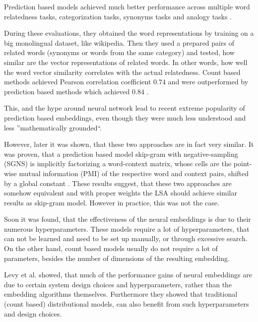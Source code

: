             Prediction based models achieved much better performance across multiple word relatedness tasks, categorization tasks, synonyms tasks and analogy tasks \cite{baroni2014don}. %
            
            During these evaluations, they obtained the word representations by training on a big monolingual dataset, like wikipedia.
            Then they used a prepared pairs of related words (synonyms or words from the same category) and tested,
            how similar are the vector representations of related words. 
            In other words, how well the word vector similarity correlates with the actual relatedness. 
            Count based methods achieved Pearson correlation coefficient $0.74$ and were outperformed by prediction based methods which achieved $0.84$ \cite{baroni2014don}.
            
            This, and the hype around neural network lead to recent extreme popularity of prediction based embeddings,
            even though they were much less understood and less ''mathematically grounded``.
            
            However, later it was shown, that these two approaches are in fact very similar.
            It was proven, that a prediction based model skip-gram with negative-sampling (SGNS) 
            is implicitly factorizing a word-context matrix,
            whose cells are the point-wise mutual information (PMI) of the respective word and context pairs, 
            shifted by a global constant \cite{levy2014neural}. %
            \* %
            These results suggest, that these two approaches are somehow equivalent and with proper weights the LSA should achieve similar results as skip-gram model. 
            However in practice, this was not the case.
            
            Soon it was found, that the effectiveness of the neural embeddings is due to their numerous hyperparameters.
            These models require a lot of hyperparameters, that can not be learned and need to be set up manually,
            or through excessive search.
            On the other hand, count based models usually do not require a lot of parameters, besides the number of dimensions of the resulting embedding. 
            
            Levy et al. \cite{levy2015improving} %
            showed, that much  of  the  performance  gains  of  neural embeddings  are  due  to  certain  system design  choices and hyperparameters, rather than the embedding algorithms themselves. 
            Furthermore they showed that traditional (count based) distributional models, 
            can also benefit from such hyperparameters and design choices.
            
